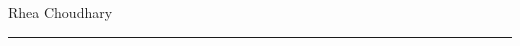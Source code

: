 \noindent
\begin{minipage}[t]{0.60\textwidth}
  {\large\bfseries \pstitle}
\end{minipage}\hfill
\begin{minipage}[t]{0.38\textwidth}
  \raggedleft
  Rhea Choudhary\\[2pt]
  \school
\end{minipage}

\vspace{0.5em}
\noindent\rule{\textwidth}{0.8pt}

\vspace{1.1em}
\psnoindent

